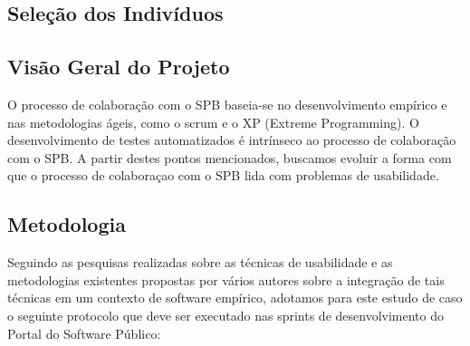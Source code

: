 \subsection{Seleção dos Indivíduos}



\subsection{Visão Geral do Projeto}

O processo de colaboração com o SPB baseia-se no desenvolvimento empírico e nas metodologias ágeis, como o scrum e o XP (Extreme Programming). O desenvolvimento de testes automatizados é intrínseco ao processo de colaboração com o SPB. A partir destes pontos mencionados, buscamos evoluir a forma com que o processo de colaboraçao com o SPB lida com problemas de usabilidade.

\subsection{Metodologia}

	Seguindo as pesquisas realizadas sobre as técnicas de usabilidade e as metodologias existentes propostas por vários autores sobre a integração de tais técnicas em um contexto de software empírico, adotamos para este estudo de caso o seguinte protocolo que deve ser executado nas sprints de desenvolvimento do Portal do Software Público:
	
